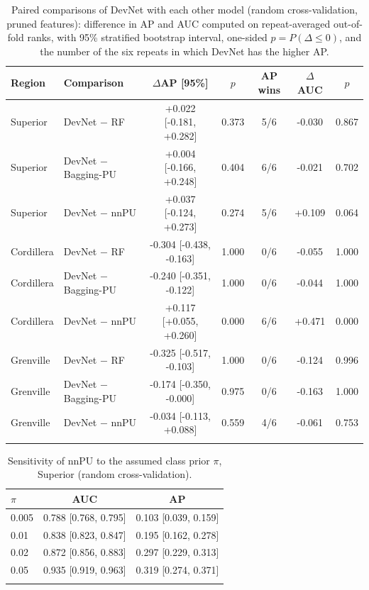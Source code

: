 \documentclass[pdflatex,sn-apa]{sn-jnl}
\begin{document}
\begin{table}[t]
\caption{Paired comparisons of DevNet with each other model (random cross-validation, pruned features): difference in AP and AUC computed on repeat-averaged out-of-fold ranks, with 95\% stratified bootstrap interval, one-sided $p = P(\Delta \leq 0)$, and the number of the six repeats in which DevNet has the higher AP.}\label{tab:bootstrap}
\footnotesize
\setlength{\tabcolsep}{2.5pt}
\begin{tabular*}{\textwidth}{@{\extracolsep\fill}llccccc}
\toprule
Region & Comparison & $\Delta$AP [95\%] & $p$ & AP wins & $\Delta$AUC & $p$ \\
\midrule
Superior & DevNet $-$ RF & +0.022 [-0.181, +0.282] & 0.373 & 5/6 & -0.030 & 0.867 \\
Superior & DevNet $-$ Bagging-PU & +0.004 [-0.166, +0.248] & 0.404 & 6/6 & -0.021 & 0.702 \\
Superior & DevNet $-$ nnPU & +0.037 [-0.124, +0.273] & 0.274 & 5/6 & +0.109 & 0.064 \\
Cordillera & DevNet $-$ RF & -0.304 [-0.438, -0.163] & 1.000 & 0/6 & -0.055 & 1.000 \\
Cordillera & DevNet $-$ Bagging-PU & -0.240 [-0.351, -0.122] & 1.000 & 0/6 & -0.044 & 1.000 \\
Cordillera & DevNet $-$ nnPU & +0.117 [+0.055, +0.260] & 0.000 & 6/6 & +0.471 & 0.000 \\
Grenville & DevNet $-$ RF & -0.325 [-0.517, -0.103] & 1.000 & 0/6 & -0.124 & 0.996 \\
Grenville & DevNet $-$ Bagging-PU & -0.174 [-0.350, -0.000] & 0.975 & 0/6 & -0.163 & 1.000 \\
Grenville & DevNet $-$ nnPU & -0.034 [-0.113, +0.088] & 0.559 & 4/6 & -0.061 & 0.753 \\
\botrule
\end{tabular*}
\end{table}

\begin{table}[t]
\caption{Sensitivity of nnPU to the assumed class prior $\pi$, Superior (random cross-validation).}\label{tab:prior}
\footnotesize
\begin{tabular*}{0.6\textwidth}{@{\extracolsep\fill}lcc}
\toprule
$\pi$ & AUC & AP \\
\midrule
0.005 & 0.788 [0.768, 0.795] & 0.103 [0.039, 0.159] \\
0.01 & 0.838 [0.823, 0.847] & 0.195 [0.162, 0.278] \\
0.02 & 0.872 [0.856, 0.883] & 0.297 [0.229, 0.313] \\
0.05 & 0.935 [0.919, 0.963] & 0.319 [0.274, 0.371] \\
\botrule
\end{tabular*}
\end{table}
\end{document}
